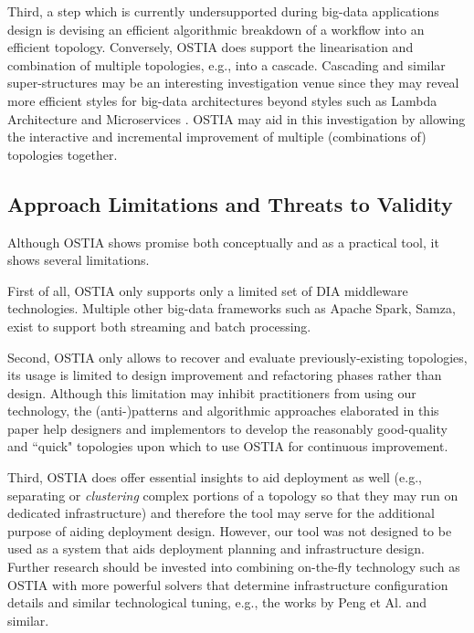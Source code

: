 \documentclass[smallextended]{svjour3}       %
\newcommand{\comment}[1]{{\textbf{\color{red}[#1]}}}
\begin{document}
Third, a step which is currently undersupported during big-data applications design is devising an efficient algorithmic breakdown of a workflow into an efficient topology. Conversely, OSTIA does support the linearisation and combination of multiple topologies, e.g., into a cascade. Cascading and similar super-structures may be an interesting investigation venue since they may reveal more efficient styles for big-data architectures beyond styles such as Lambda Architecture \cite{lambda} and Microservices \cite{balalaie2016microservices}. OSTIA may aid in this investigation by allowing the interactive and incremental improvement of multiple (combinations of) topologies together.

\subsection{Approach Limitations and Threats to Validity}\label{lim}

Although OSTIA shows promise both conceptually and as a practical tool, it shows several limitations.

First of all, OSTIA only supports only a limited set of DIA middleware technologies. Multiple other big-data frameworks such as Apache Spark, Samza, exist to support both streaming and batch processing. 

Second, OSTIA only allows to recover and evaluate previously-existing topologies, its usage is limited to design improvement and refactoring phases rather than design. Although this limitation may inhibit practitioners from using our technology, the (anti-)patterns and algorithmic approaches elaborated in this paper help designers and implementors to develop the reasonably good-quality and ``quick" topologies upon which to use OSTIA for continuous improvement.

Third, OSTIA does offer essential insights to aid deployment as well (e.g., separating or \emph{clustering} complex portions of a topology so that they may run on dedicated infrastructure) and therefore the tool may serve for the additional purpose of aiding deployment design. However, our tool was not designed to be used as a system that aids deployment planning and infrastructure design. Further research should be invested into combining on-the-fly technology such as OSTIA with more powerful solvers that determine infrastructure configuration details and similar technological tuning, e.g., the works by Peng et Al. \cite{PengGWRYC14} and similar.
\end{document}
